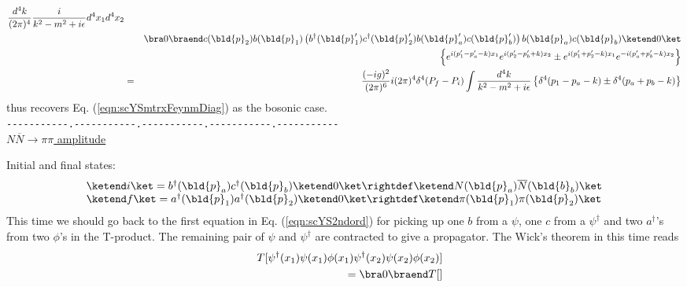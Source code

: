 {\begin{eqnarray}
\frac{d^4 k}{(2\pi)^4} \frac{i}{k^2 - m^2 + i\epsilon}
d^4x_1 d^4x_2
\nonumber\\
&&
\bra 0 \braend
c(\bld{p}_2) b(\bld{p}_1)
\left(
b^\dagger(\bld{p}_1') c^\dagger(\bld{p}_2') b(\bld{p}_a') c(\bld{p}_b')
\right)
b(\bld{p}_a) c(\bld{p}_b) 
\ketend 0 \ket
\nonumber\\
&&
\left\{
e^{i(p_1' - p_a' - k)x_1} e^{i(p_2' - p_b' + k)x_2} 
\pm
e^{i(p_1' + p_2' - k)x_1} e^{-i(p_a' + p_b' - k)x_2} 
\right\}
\nonumber\\
&=&
\frac{(-ig)^2}{(2\pi)^6} i (2\pi)^4 \delta^4(P_f - P_i)
\int
\frac{d^4 k}{k^2 - m^2 + i\epsilon}
\left\{
\delta^4 (p_1 - p_a - k)
\pm
\delta^4 (p_a + p_b - k)
\right\}
\nonumber
\end{eqnarray}
thus recovers Eq. (\ref{eqn:scYSmtrxFeynmDiag})
as the bosonic case.
}\\
\verb/-----------.-----------.-----------.-----------.-----------/\\

\bigskip
\noindent
\underline{$N\overline{N} \to \pi \pi$ amplitude}

\bigskip

Initial and final states:
\begin{eqnarray}
\begin{array}{l}
\ketend i \ket
=
b^\dagger(\bld{p}_a) c^\dagger(\bld{p}_b) \ketend 0 \ket
\rightdef
\ketend N(\bld{p}_a) \overline{N}(\bld{b}_b )\ket
\\
\ketend f \ket
=
a^\dagger(\bld{p}_1) a^\dagger(\bld{p}_2) \ketend 0 \ket
\rightdef
\ketend \pi(\bld{p}_1) \pi (\bld{p}_2) \ket
\end{array}
\label{eqn:scYNNbarPiPiinit}
\end{eqnarray}
This time we should go back to the first equation in Eq. (\ref{eqn:scYS2ndord})
for picking up
one $b$ from a $\psi$, one $c$ from a $\psi^\dagger$ and two $a^\dagger$'s from 
two $\phi$'s in the T-product. The remaining pair of $\psi$ and $\psi^\dagger$ are
contracted to give a propagator. The Wick's theorem in this time reads
\begin{eqnarray}
&&
T[
\psi^\dagger(x_1) \psi(x_1) \phi(x_1)
\psi^\dagger(x_2) \psi(x_2) \phi(x_2)
]
\nonumber\\
&&
= 
\bra 0 \braend T[]
\end{eqnarray}








